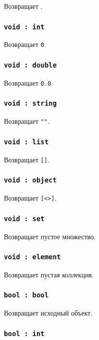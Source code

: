 \documentclass[a4paper, 14pt]{extarticle}
\begin{document}
Возвращает \false.

\subsubsection{\lstinline|void : int|}

Возвращает \lstinline|0|.

\subsubsection{\lstinline|void : double|}

Возвращает \lstinline|0.0|.

\subsubsection{\lstinline|void : string|}

Возвращает \lstinline|""|.

\subsubsection{\lstinline|void : list|}

Возвращает \lstinline|[]|.

\subsubsection{\lstinline|void : object|}

Возвращает \lstinline|[<>]|.

\subsubsection{\lstinline|void : set|}

Возвращает пустое множество.

\subsubsection{\lstinline|void : element|}

Возвращает пустая коллекция.

\subsubsection{\lstinline|bool : bool|}

Возвращает исходный объект.

\subsubsection{\lstinline|bool : int|}
\end{document}
